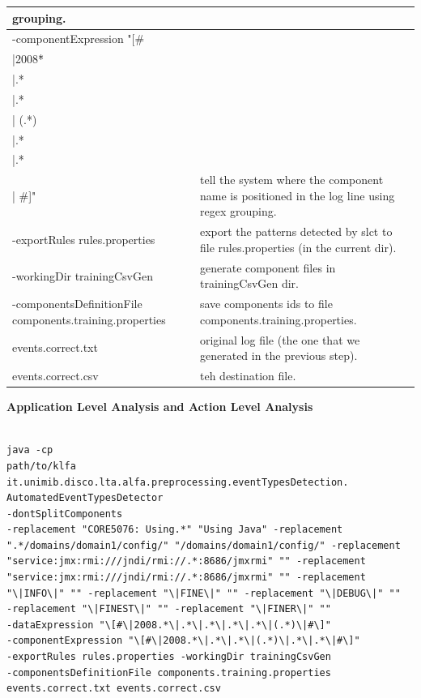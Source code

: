 \begin{longtable}{|p{6cm}|p{4cm}|}
grouping.\\
\hline
-componentExpression
"[\#\\|2008\.*\\|.*\\|.*\\|
(.*)\\|.*\\|.*\\|
\#]"&tell the
system where the component name is positioned in the log line using
regex
grouping.\\
\hline
-exportRules rules.properties&export the patterns detected by slct to
file rules.properties (in the current dir).\\
\hline
-workingDir trainingCsvGen&generate component files in trainingCsvGen
dir.\\
\hline
-componentsDefinitionFile components.training.properties&save
components ids to file components.training.properties.\\
\hline
events.correct.txt&original log file (the one that we generated in
the previous step).\\
events.correct.csv&teh destination file.\\
\hline



\end{longtable}



\textbf{Application Level Analysis and Action Level Analysis}

\begin{verbatim}

java -cp
path/to/klfa
it.unimib.disco.lta.alfa.preprocessing.eventTypesDetection.
AutomatedEventTypesDetector
-dontSplitComponents
-replacement "CORE5076: Using.*" "Using Java" -replacement
".*/domains/domain1/config/" "/domains/domain1/config/" -replacement
"service:jmx:rmi:///jndi/rmi://.*:8686/jmxrmi" "" -replacement
"service:jmx:rmi:///jndi/rmi://.*:8686/jmxrmi" "" -replacement
"\|INFO\|" "" -replacement "\|FINE\|" "" -replacement "\|DEBUG\|" ""
-replacement "\|FINEST\|" "" -replacement "\|FINER\|" ""
-dataExpression "\[#\|2008.*\|.*\|.*\|.*\|.*\|(.*)\|#\]"
-componentExpression "\[#\|2008.*\|.*\|.*\|(.*)\|.*\|.*\|#\]"
-exportRules rules.properties -workingDir trainingCsvGen
-componentsDefinitionFile components.training.properties
events.correct.txt events.correct.csv



\end{verbatim}


